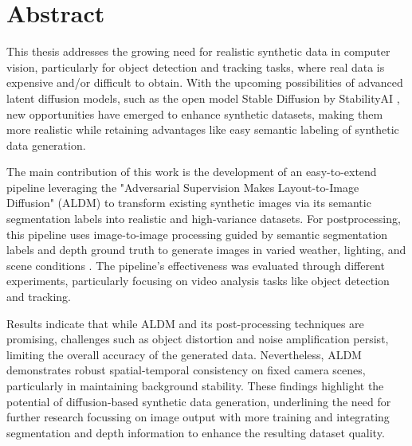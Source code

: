 \chapter*{Abstract}

This thesis addresses the growing need for realistic synthetic data in computer vision, particularly for object detection and tracking tasks, where real data is expensive and/or difficult to obtain. With the upcoming possibilities of advanced latent diffusion models, such as the open model Stable Diffusion by StabilityAI \cite{esser2024scalingrectifiedflowtransformers}, new opportunities have emerged to enhance synthetic datasets, making them more realistic while retaining advantages like easy semantic labeling of synthetic data generation.

The main contribution of this work is the development of an easy-to-extend pipeline leveraging the "Adversarial Supervision Makes Layout-to-Image Diffusion" (ALDM) \cite{li2024aldm} to transform existing synthetic images via its semantic segmentation labels into  realistic and high-variance datasets. For postprocessing, this pipeline uses image-to-image processing guided by semantic segmentation labels and depth ground truth to generate images in varied weather, lighting, and scene conditions \cite{rombach2022highresolution} \cite{zhang2023addingconditionalcontroltexttoimage}. The pipeline's effectiveness was evaluated through different experiments, particularly focusing on video analysis tasks like object detection and tracking.

Results indicate that while ALDM and its post-processing techniques are promising, challenges such as object distortion and noise amplification persist, limiting the overall accuracy of the generated data. Nevertheless, ALDM demonstrates robust spatial-temporal consistency on fixed camera scenes, particularly in maintaining background stability. These findings highlight the potential of diffusion-based synthetic data generation, underlining the need for further research focussing on image output with more training and integrating segmentation and depth information to enhance the resulting dataset quality.

\vspace*{10px}
\hspace*{-0.6cm}\raisebox{-1pt}{\faGithub} \href{https://github.com/Nomiez/bridging-the-domain-gap-by-diffusion}{\fontsize{8.8pt}{0pt}}


